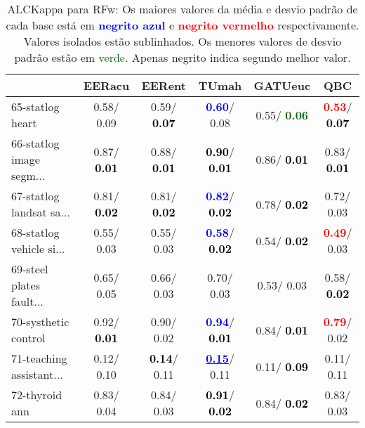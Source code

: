 \begin{table}[h]
\caption{ALCKappa para RFw: Os maiores valores da média e desvio padrão de cada base está em \textcolor{blue}{\textbf{negrito azul}} e \textcolor{red}{\textbf{negrito vermelho}} respectivamente. Valores isolados estão sublinhados. Os menores valores de desvio padrão estão em \textcolor{darkgreen}{verde}. Apenas negrito indica segundo melhor valor.}
\begin{center}\begin{tabular}{lc|c|c|c|c}
 & EERacu & EERent & TUmah & \textbf{GATUeuc} & QBC\\ \hline 65-statlog heart &   0.58/  0.09 &   0.59/\textcolor{black}{\textbf{  0.07}} & \textcolor{blue}{\textbf{  0.60}}/  0.08 &   0.55/\textcolor{darkgreen}{\textbf{  0.06}} & \textcolor{red}{\textbf{  0.53}}/\textcolor{black}{\textbf{  0.07}} \\
66-statlog image segm... &   0.87/\textcolor{black}{\textbf{  0.01}} &   0.88/\textcolor{black}{\textbf{  0.01}} & \textcolor{black}{\textbf{  0.90}}/\textcolor{black}{\textbf{  0.01}} &   0.86/\textcolor{black}{\textbf{  0.01}} &   0.83/\textcolor{black}{\textbf{  0.01}} \\
67-statlog landsat sa... &   0.81/\textcolor{black}{\textbf{  0.02}} &   0.81/\textcolor{black}{\textbf{  0.02}} & \textcolor{blue}{\textbf{  0.82}}/\textcolor{black}{\textbf{  0.02}} &   0.78/\textcolor{black}{\textbf{  0.02}} &   0.72/  0.03 \\
68-statlog vehicle si... &   0.55/  0.03 &   0.55/  0.03 & \textcolor{blue}{\textbf{  0.58}}/\textcolor{black}{\textbf{  0.02}} &   0.54/\textcolor{black}{\textbf{  0.02}} & \textcolor{red}{\textbf{  0.49}}/  0.03 \\
69-steel plates fault... &   0.65/  0.05 &   0.66/  0.03 &   0.70/  0.03 &   0.53/  0.03 &   0.58/\textcolor{black}{\textbf{  0.02}} \\
70-systhetic control &   0.92/\textcolor{black}{\textbf{  0.01}} &   0.90/  0.02 & \textcolor{blue}{\textbf{  0.94}}/\textcolor{black}{\textbf{  0.01}} &   0.84/\textcolor{black}{\textbf{  0.01}} & \textcolor{red}{\textbf{  0.79}}/  0.02 \\
71-teaching assistant... &   0.12/  0.10 & \textcolor{black}{\textbf{  0.14}}/  0.11 & \underline{\textcolor{blue}{\textbf{  0.15}}}/  0.11 &   0.11/\textcolor{black}{\textbf{  0.09}} &   0.11/  0.11 \\ \hline
72-thyroid ann &   0.83/  0.04 &   0.84/  0.03 & \textcolor{black}{\textbf{  0.91}}/\textcolor{black}{\textbf{  0.02}} &   0.84/\textcolor{black}{\textbf{  0.02}} &   0.83/  0.03 \\

\end{tabular}
\end{center}
\end{table}
